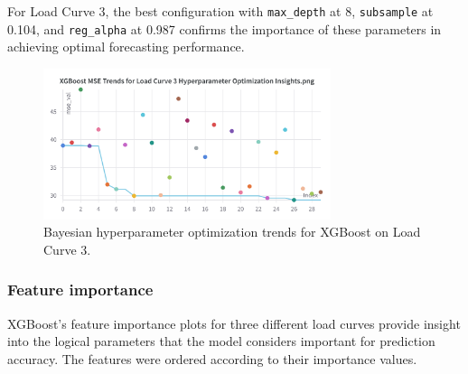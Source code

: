 \documentclass{article} %
\begin{document}
For Load Curve 3, the best configuration with \texttt{max\_depth} at 8, \texttt{subsample} at 0.104, and \texttt{reg\_alpha} at 0.987 confirms the importance of these parameters in achieving optimal forecasting performance.
\begin{figure}[H]
    \centering
    \includegraphics[width=0.75\textwidth]{ressources/Hyperparams/XGBoost/XGBoost MSE Trends for Load Curve 3 Hyperparameter Optimization Insights.png }
    \caption{Bayesian hyperparameter optimization trends for XGBoost on Load Curve 3.}
    \label{fig:xgboost_lc3}
\end{figure}
\subsubsection{Feature importance}
XGBoost's feature importance plots for three different load curves provide insight into the logical parameters that the model considers important for prediction accuracy. The features were ordered according to their importance values.
\end{document}
